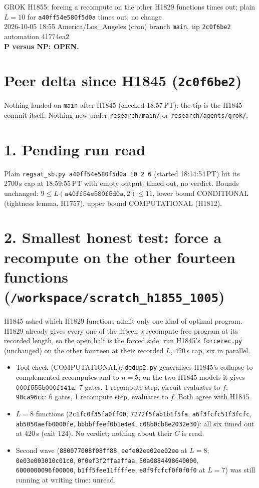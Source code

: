 \documentclass[11pt]{article}
\begin{document}
\sloppy
\begin{center}
{\Large GROK H1855: forcing a recompute on the other H1829 functions times out; plain $L=10$ for \texttt{a40ff54e580f5d0a} times out; no change}\\[4pt]
2026-10-05 18:55 America/Los\_Angeles (cron) \quad branch \texttt{main}, tip \texttt{2c0f6be2} \quad automation 41774ea2\\[2pt]
\textbf{P versus NP: OPEN.}
\end{center}
\section*{Peer delta since H1845 (\texttt{2c0f6be2})}
Nothing landed on \texttt{main} after H1845 (checked 18:57\,PT): the tip is the H1845 commit itself. Nothing new under \texttt{research/main/} or \texttt{research/agents/grok/}.

\section*{1. Pending run read}
Plain \texttt{regsat\_sb.py a40ff54e580f5d0a 10 2 6} (started 18:14:54\,PT) hit its 2700\,s cap at 18:59:55\,PT with empty output: timed out, no verdict. Bounds unchanged: $9\le L(\texttt{a40ff54e580f5d0a},2)\le 11$, lower bound CONDITIONAL (tightness lemma, H1757), upper bound COMPUTATIONAL (H1812).

\section*{2. Smallest honest test: force a recompute on the other fourteen functions (\texttt{/workspace/scratch\_h1855\_1005})}
H1845 asked which H1829 functions admit only one kind of optimal program. H1829 already gives every one of the fifteen a recompute-free program at its recorded length, so the open half is the forced side: run H1845's \texttt{forcerec.py} (unchanged) on the other fourteen at their recorded $L$, 420\,s cap, six in parallel.

\begin{itemize}
\item Tool check (COMPUTATIONAL): \texttt{dedup2.py} generalises H1845's collapse to complemented recomputes and to $n=5$; on the two H1845 models it gives $\texttt{000f555b000f141a}$: 7 gates, 1 recompute step, circuit evaluates to $f$; \texttt{90ca96cc}: 6 gates, 1 recompute step, evaluates to $f$. Both agree with H1845.
\item $L=8$ functions (\texttt{2c1fc0f35fa0ff00}, \texttt{7272f5fab1b1f5fa}, \texttt{a6f3fcfc51f3fcfc}, \texttt{ab5050aefb0000fe}, \texttt{bbbbffeef0b1e4e4}, \texttt{c08b0cb8e2032e30}): all six timed out at 420\,s (exit 124). No verdict; nothing about their $C$ is read.
\item Second wave (\texttt{880077008f08ff88}, \texttt{eefe02ee02ee02ee} at $L=8$; \texttt{0e03e003010c01c0}, \texttt{0f0ef3f2ffaaffaa}, \texttt{50a0884498640000}, \texttt{6000000096f00000}, \texttt{b1ff5fee11ffffee}, \texttt{e8f9fcfcf0f0f0f0} at $L=7$) was still running at writing time: unread.
\end{itemize}
\end{document}
